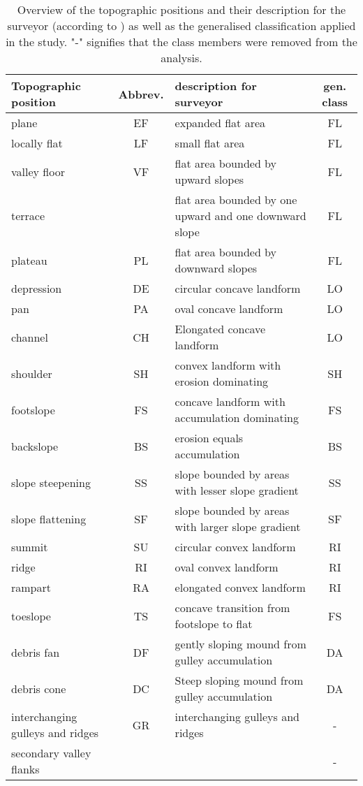\documentclass[preprint,12pt,authoryear]{elsarticle}
\begin{document}
\begin{table}[!htbp]
\caption{Overview of the topographic positions and their description for the surveyor (according to \cite{Englisch1998}) as well as the generalised classification applied in the study. "-" signifies that the class members were removed from the analysis.}
\begin{center}    \begin{tabular}{  p{3cm} c p{7cm} c }
	\hline
	Topographic position & Abbrev. & description for surveyor & gen. class \\ \hline
	plane &EF& expanded flat area  & FL \\ \hline
	locally flat &LF&	small flat area  & FL \\  \hline
	valley floor &VF& flat area bounded by upward slopes  & FL \\  \hline
	\raisebox{-0ex} {terrace} &\raisebox{-0ex}{TE} & flat area bounded by one upward and one downward slope  & FL \\   \hline
	plateau &PL& flat area bounded by downward slopes  & FL \\   \hline
	depression &DE& circular concave landform & LO \\   \hline
	pan &PA& oval concave landform & LO  \\   \hline
	channel &CH& Elongated concave landform  & LO\\   \hline
	shoulder &SH& convex landform with erosion dominating & SH \\   \hline
	footslope &FS& concave landform with accumulation dominating  & FS\\   \hline
	backslope &BS& erosion equals accumulation & BS  \\   \hline
	slope steepening &SS& slope bounded by areas with lesser slope gradient  & SS \\   \hline
	slope flattening &SF& slope bounded by areas with larger slope gradient & SF \\   \hline
 	summit &SU& circular convex landform & RI \\   \hline
	ridge &RI& oval convex landform  & RI\\   \hline
	rampart &RA& elongated convex landform  & RI\\   \hline
	toeslope &TS& concave transition from footslope to flat & FS \\   \hline
	debris fan &DF& gently sloping mound from gulley accumulation & DA  \\   \hline
	debris cone &DC& Steep sloping mound from gulley accumulation  & DA\\   \hline
	interchanging gulleys and ridges &\raisebox{-1.5ex} {GR} & \raisebox {-1.5ex} {interchanging gulleys and ridges} & -  \\  \hline
	secondary valley flanks &\raisebox{-1.5ex}{SV}& \raisebox{-1.5ex}{secondary valley flanks}  & - \\   \hline
    \end{tabular}
\end{center}	
\label{table:topopositions}
\end{table}
\end{document}
